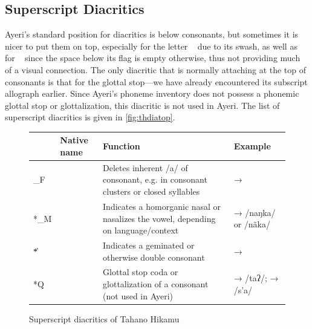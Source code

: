 \subsection{Superscript Diacritics}

Ayeri's standard position for diacritics is below consonants, but sometimes it 
is nicer to put them on top, especially for the letter ~ due to 
its swash, as well as for ~ since the space below its flag is 
empty otherwise, thus not providing much of a visual connection. The only 
diacritic that is normally attaching at the top of consonants is that for the 
glottal stop---we have already encountered its subscript allograph earlier. 
Since Ayeri's phoneme inventory does not possess a phonemic glottal stop or 
glottalization, this diacritic is not used in Ayeri. The list of superscript 
diacritics is given in \autoref{fig:thdiatop}.

\begin{figure}[htp]
\caption{Superscript diacritics of Tahano Hikamu}
\begin{tabu} to 
\toprule
\tableheaderfont

	& Native name
	& Function
	& Example
	\\
	
\toprule

*\_F
	& 
	& Deletes inherent /a/ of consonant, e.g. in consonant clusters or 
		closed syllables
	&  → 
	\\
	
\midrule

*\_M
	& 
	& Indicates a homorganic nasal or nasalizes the vowel, depending on 
		language/context
	&  →  /naŋka/ or /nãka/
	\\
	
\midrule

*̔
	& 
	& Indicates a geminated or otherwise double consonant
	&  → 
	\\
	
\midrule

*Q
	& 
	& Glottal stop coda or glottalization of a consonant (not used in Ayeri)
	&  →  /taʔ/;\newline
		 →  /s’a/
	\\

\bottomrule
\end{tabu}
\label{fig:thdiatop}
\end{figure}

